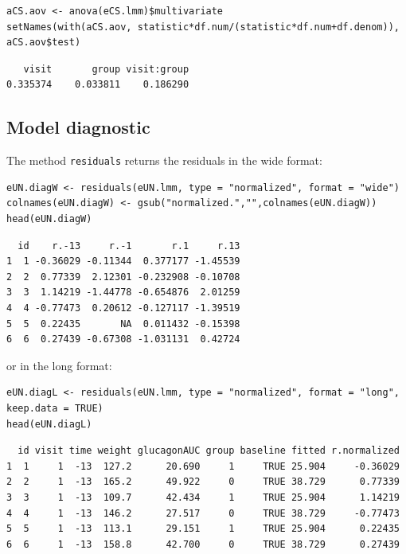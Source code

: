 \documentclass[12pt]{article}
\begin{document}
\lstset{language=r,label= ,caption= ,captionpos=b,numbers=none}
\begin{lstlisting}
aCS.aov <- anova(eCS.lmm)$multivariate
setNames(with(aCS.aov, statistic*df.num/(statistic*df.num+df.denom)), aCS.aov$test)
\end{lstlisting}

\begin{verbatim}
   visit       group visit:group 
0.335374    0.033811    0.186290
\end{verbatim}



\bigskip


\clearpage

\subsection{Model diagnostic}
\label{sec:org98f4b82}

The method \texttt{residuals} returns the residuals in the wide format:
\lstset{language=r,label= ,caption= ,captionpos=b,numbers=none}
\begin{lstlisting}
eUN.diagW <- residuals(eUN.lmm, type = "normalized", format = "wide")
colnames(eUN.diagW) <- gsub("normalized.","",colnames(eUN.diagW))
head(eUN.diagW)
\end{lstlisting}

\begin{verbatim}
  id    r.-13     r.-1       r.1     r.13
1  1 -0.36029 -0.11344  0.377177 -1.45539
2  2  0.77339  2.12301 -0.232908 -0.10708
3  3  1.14219 -1.44778 -0.654876  2.01259
4  4 -0.77473  0.20612 -0.127117 -1.39519
5  5  0.22435       NA  0.011432 -0.15398
6  6  0.27439 -0.67308 -1.031131  0.42724
\end{verbatim}


or in the long format:
\lstset{language=r,label= ,caption= ,captionpos=b,numbers=none}
\begin{lstlisting}
eUN.diagL <- residuals(eUN.lmm, type = "normalized", format = "long", keep.data = TRUE)
head(eUN.diagL)
\end{lstlisting}

\begin{verbatim}
  id visit time weight glucagonAUC group baseline fitted r.normalized
1  1     1  -13  127.2      20.690     1     TRUE 25.904     -0.36029
2  2     1  -13  165.2      49.922     0     TRUE 38.729      0.77339
3  3     1  -13  109.7      42.434     1     TRUE 25.904      1.14219
4  4     1  -13  146.2      27.517     0     TRUE 38.729     -0.77473
5  5     1  -13  113.1      29.151     1     TRUE 25.904      0.22435
6  6     1  -13  158.8      42.700     0     TRUE 38.729      0.27439
\end{verbatim}
\end{document}
